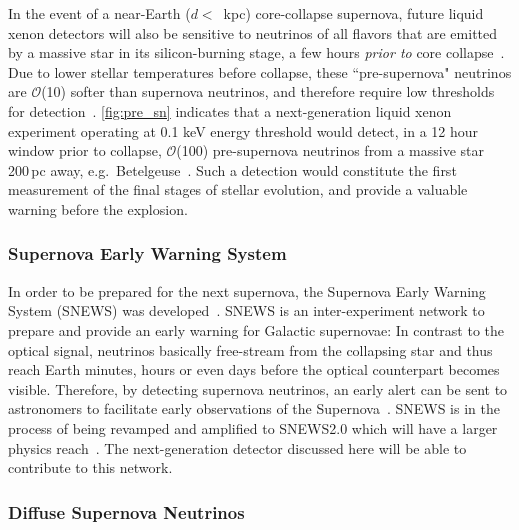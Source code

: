 In the event of a near-Earth ($d <$~kpc) core-collapse supernova, future liquid xenon detectors will also be sensitive to neutrinos of all flavors that are emitted by a massive star in its silicon-burning stage, a few hours \textit{prior to} core collapse~\cite{Odrzywolek:2003vn,Odrzywolek:2004em}. Due to lower stellar temperatures before collapse, these ``pre-supernova" neutrinos are $\mathcal{O}$(10) softer than supernova neutrinos, and therefore require low thresholds for detection~\cite{Kato:2020hlc}. \autoref{fig:pre_sn} indicates that a next-generation liquid xenon experiment operating at 0.1 keV energy threshold would detect, in a 12 hour window prior to collapse, $\mathcal{O}$(100) pre-supernova neutrinos from a massive star 200\,pc away, e.g.~Betelgeuse~\cite{Raj:2019wpy}. Such a detection would constitute the first measurement of the final stages of stellar evolution, and provide a valuable warning before the explosion.

\subsubsection{Supernova Early Warning System} 

In order to be prepared for the next supernova, the Supernova Early Warning System (SNEWS) was developed~\cite{snewsweb}. SNEWS is an inter-experiment network to prepare and provide an early warning for Galactic supernovae: In contrast to the optical signal, neutrinos basically free-stream from the collapsing star and thus reach Earth minutes, hours or even days before the optical counterpart becomes visible. Therefore, by detecting supernova neutrinos, an early alert can be sent to astronomers to facilitate early observations of the Supernova~\cite{Antonioli:2004zb}. SNEWS is in the process of being revamped and amplified to SNEWS2.0 which will have a larger physics reach~\cite{Kharusi:2020ovw,Baxter:2021aaa}. The next-generation detector discussed here will be able to contribute to this network.

\subsubsection{Diffuse Supernova Neutrinos}

